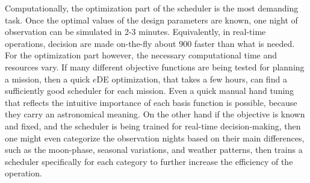 \documentclass[12pt]{aastex62}
\theoremstyle{definition}
\begin{document}
Computationally, the optimization part of the scheduler is the most demanding task. Once the optimal values of the design parameters are known, one night of observation can be simulated in 2-3 minutes. Equivalently, in real-time operations, decision are made on-the-fly about 900 faster than what is needed. For the optimization part however, the necessary computational time and resources vary. If many different objective functions are being tested for planning a mission, then a quick $e$DE optimization, that takes a few hours, can find a sufficiently good scheduler for each mission. Even a quick manual hand tuning that reflects the intuitive importance of each basis function is possible, because they carry an astronomical meaning. On the other hand if the objective is known and fixed, and the scheduler is being trained for real-time decision-making, then one might even categorize the observation nights based on their main differences, such as the moon-phase, seasonal variations, and weather patterns, then trains a scheduler specifically for each category to further increase the efficiency of the operation. 


\appendix
\end{document}
